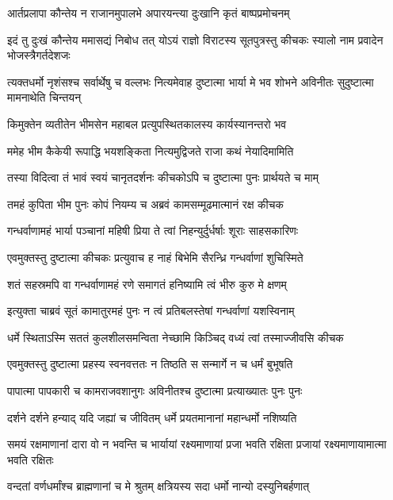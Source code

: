 

\twolineshloka
{आर्तप्रलापा कौन्तेय न राजानमुपालभे}
{अपारयन्त्या दुःखानि कृतं बाष्पप्रमोचनम्}


\onelineshloka
{इदं तु दुःखं कौन्तेय ममासद्यं निबोध तत्}
\twolineshloka
{योऽयं राज्ञो विराटस्य सूतपुत्रस्तु कीचकः}
{स्यालो नाम प्रवादेन भोजस्त्रैगर्तदेशजः}


\threelineshloka
{त्यक्तधर्मो नृशंसश्च सर्वार्थेषु च वल्लभः}
{नित्यमेवाह दुष्टात्मा भार्या मे भव शोभने}
{अविनीतः सुदुष्टात्मा मामनाथेति चिन्तयन्}


\twolineshloka
{किमुक्तेन व्यतीतेन भीमसेन महाबल}
{प्रत्युपस्थितकालस्य कार्यस्यानन्तरो भव}


\twolineshloka
{ममेह भीम कैकेयी रूपाद्धि भयशङ्किता}
{नित्यमुद्विजते राजा कथं नेयादिमामिति}


\twolineshloka
{तस्या विदित्वा तं भावं स्वयं चानृतदर्शनः}
{कीचकोऽपि च दुष्टात्मा पुनः प्रार्थयते च माम्}


\twolineshloka
{तमहं कुपिता भीम पुनः कोपं नियम्य च}
{अब्रवं कामसम्मूढमात्मानं रक्ष कीचक}


\twolineshloka
{गन्धर्वाणामहं भार्या पञ्चानां महिषी प्रिया}
{ते त्वां निहन्युर्दुर्धर्षाः शूराः साहसकारिणः}


\twolineshloka
{एवमुक्तस्तु दुष्टात्मा कीचकः प्रत्युवाच ह}
{नाहं बिभेमि सैरन्ध्रि गन्धर्वाणां शुचिस्मिते}


\twolineshloka
{शतं सहस्रमपि वा गन्धर्वाणामहं रणे}
{समागतं हनिष्यामि त्वं भीरु कुरु मे क्षणम्}


\twolineshloka
{इत्युक्ता चाब्रवं सूतं कामातुरमहं पुनः}
{न त्वं प्रतिबलस्तेषां गन्धर्वाणां यशस्विनाम्}


\twolineshloka
{धर्मे स्थिताऽस्मि सततं कुलशीलसमन्विता}
{नेच्छामि किञ्चिद् वध्यं त्वां तस्माज्जीवसि कीचक}


\twolineshloka
{एवमुक्तस्तु दुष्टात्मा प्रहस्य स्वनवत्ततः}
{न तिष्ठति स सन्मार्गे न च धर्मं बुभूषति}


\twolineshloka
{पापात्मा पापकारी च कामराजवशानुगः}
{अविनीतश्च दुष्टात्मा प्रत्याख्यातः पुनः पुनः}


\twolineshloka
{दर्शने दर्शने हन्याद् यदि जह्यां च जीवितम्}
{धर्मे प्रयतमानानां महान्धर्मो नशिष्यति}


\threelineshloka
{समयं रक्षमाणानां दारा वो न भवन्ति च}
{भार्यायां रक्ष्यमाणायां प्रजा भवति रक्षिता}
{प्रजायां रक्ष्यमाणायामात्मा भवति रक्षितः}


\twolineshloka
{वन्दतां वर्णधर्मांश्च ब्राह्मणानां च मे श्रुतम्}
{क्षत्रियस्य सदा धर्मो नान्यो दस्युनिबर्हणात्}



